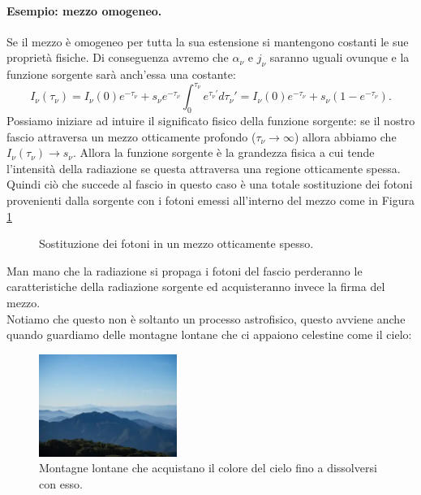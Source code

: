 \paragraph{Esempio: mezzo omogeneo.}%
Se il mezzo è omogeneo per tutta la sua estensione si mantengono costanti le sue proprietà fisiche. Di conseguenza avremo che $\alpha _{\nu} $ e $j _{\nu} $ saranno uguali ovunque e la funzione sorgente sarà anch'essa una costante:
\[
	I_{\nu}\left( \tau_{\nu} \right) = I_{\nu}\left( 0 \right) e^{-\tau_{\nu}} + s_{\nu} e^{-\tau_{\nu}}\int_0^{\tau_{\nu}} e^{\tau_{\nu}'}d \tau_{\nu}' =
	I_{\nu}\left( 0 \right) e^{-\tau_{\nu}} + s_{\nu}\left( 1-e^{-\tau_{\nu}} \right) \label{eq:soluzione-mezzo-omogeneo}
.\] 
Possiamo iniziare ad intuire il significato fisico della funzione sorgente:
se il nostro fascio attraversa un mezzo otticamente profondo ($\tau_{\nu}\rightarrow \infty$) allora abbiamo che $I_{\nu}\left( \tau_{\nu} \right) \rightarrow s_{\nu}$. Allora la funzione sorgente è la grandezza fisica a cui tende l'intensità della radiazione se questa attraversa una regione otticamente spessa. Quindi ciò che succede al fascio in questo caso è una totale sostituzione dei fotoni provenienti dalla sorgente con i fotoni emessi all'interno del mezzo come in Figura \ref{fig:soluzione-all-equazione-del-trasporto-per-mezzo-otticamente-spesso}
\begin{figure}[H]
    \centering
    \caption{\scriptsize Sostituzione dei fotoni in un mezzo otticamente spesso.}
    \label{fig:soluzione-all-equazione-del-trasporto-per-mezzo-otticamente-spesso}
\end{figure}
\noindent
Man mano che la radiazione si propaga i fotoni del fascio perderanno le caratteristiche della radiazione sorgente ed acquisteranno invece la firma del mezzo.\\
Notiamo che questo non è soltanto un processo astrofisico, questo avviene anche quando guardiamo delle montagne lontane che ci appaiono celestine come il cielo:
\begin{figure}[H]
	\centering
	\includegraphics[width=0.4\textwidth]{figures/farmountain.png}
	\caption{\scriptsize Montagne lontane che acquistano il colore del cielo fino a dissolversi con esso.}
	\label{fig:figures-farmountain-jpg}
\end{figure}

